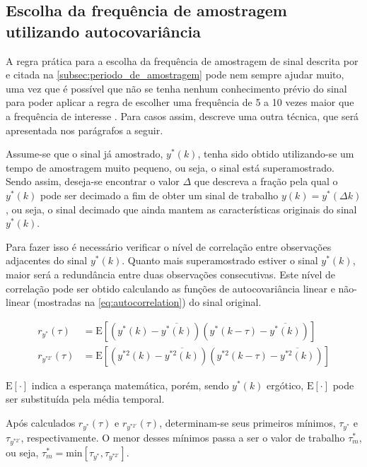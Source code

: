 \begin{apendicesenv}
\chapter{Escolha da frequência de amostragem utilizando autocovariância}
\label{ch:sampling_time_using_autocorrelation}

A regra prática para a escolha da frequência de amostragem de sinal descrita por 
e citada na \cref{subsec:periodo_de_amostragem} pode nem sempre ajudar muito, uma vez que é possível
que não se tenha nenhum conhecimento prévio do sinal para poder aplicar a regra de escolher uma frequência
de 5 a 10 vezes maior que a frequência de interesse \cite{Aguirre2015}. Para casos assim, 
descreve uma outra técnica, que será apresentada nos parágrafos a seguir. 

Assume-se que o sinal já amostrado, $y^*(k)$, tenha sido obtido utilizando-se um tempo
de amostragem muito pequeno, ou seja, o sinal está superamostrado. Sendo assim, deseja-se encontrar o
valor $\Delta$ que descreva a fração pela qual o $y^*(k)$ pode ser decimado a fim de obter um sinal de trabalho
$y(k) = y^*(\Delta k)$, ou seja, o sinal decimado que ainda mantem as características originais do sinal $y^*(k)$.

Para fazer isso é necessário verificar o nível de correlação entre observações adjacentes do sinal
$y^*(k)$. Quanto mais superamostrado estiver o sinal $y^*(k)$, maior será a redundância entre duas
observações consecutivas. Este nível de correlação pode ser obtido calculando as funções de
autocovariância linear e não-linear (mostradas na \cref{eq:autocorrelation}) do sinal original.

\begin{subequations}
    \label{eq:autocorrelation}
    \begin{align}
		r_{y^*}(\tau) &= \mathrm{E} \left[(y^*(k) - \overline{y^*(k)}) (y^*(k - \tau) - \overline{y^*(k)})\right]		\\
		r_{y^{*2'}}(\tau) &= \mathrm{E} \left[(y^{*2}(k) - \overline{y^{*2}(k)}) (y^{*2}(k - \tau) - \overline{y^{*2}(k)})\right]
    \end{align}
\end{subequations}

$\mathrm{E}[\cdot]$ indica a esperança matemática, porém, sendo $y^*(k)$ ergótico, $\mathrm{E}[\cdot]$
pode ser substituída pela média temporal.

Após calculados $r_{y^*}(\tau)$ e $r_{y^{*2'}}(\tau)$, determinam-se seus primeiros mínimos,
$\tau_{y^*}$ e $\tau_{y^{*2'}}$, respectivamente. O menor desses mínimos passa a ser o valor de trabalho
$\tau_{m}^{*}$, ou seja, $\tau_{m}^{*} = \mathrm{min} \left[ \tau_{y^*} , \tau_{y^{*2'}} \right]$.


\end{apendicesenv}

